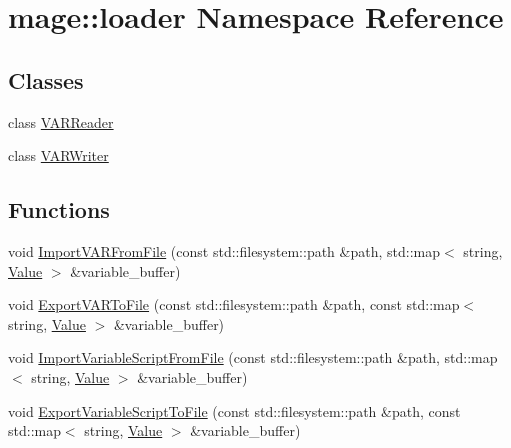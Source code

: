 \hypertarget{namespacemage_1_1loader}{}\section{mage\+:\+:loader Namespace Reference}
\label{namespacemage_1_1loader}
\subsection*{Classes}
\begin{DoxyCompactItemize}
\item 
class \mbox{\hyperlink{classmage_1_1loader_1_1_v_a_r_reader}{V\+A\+R\+Reader}}
\item 
class \mbox{\hyperlink{classmage_1_1loader_1_1_v_a_r_writer}{V\+A\+R\+Writer}}
\end{DoxyCompactItemize}
\subsection*{Functions}
\begin{DoxyCompactItemize}
\item 
void \mbox{\hyperlink{namespacemage_1_1loader_a0e99f2c09901dbd40c8b21337e4df664}{Import\+V\+A\+R\+From\+File}} (const std\+::filesystem\+::path \&path, std\+::map$<$ string, \mbox{\hyperlink{namespacemage_a5bc219b33037a43e23f59e4e8ddff10d}{Value}} $>$ \&variable\+\_\+buffer)
\item 
void \mbox{\hyperlink{namespacemage_1_1loader_a991788a6fa0dc0cd2aa31d865487f535}{Export\+V\+A\+R\+To\+File}} (const std\+::filesystem\+::path \&path, const std\+::map$<$ string, \mbox{\hyperlink{namespacemage_a5bc219b33037a43e23f59e4e8ddff10d}{Value}} $>$ \&variable\+\_\+buffer)
\item 
void \mbox{\hyperlink{namespacemage_1_1loader_a6b514f15e0f159970246055b5fe71e36}{Import\+Variable\+Script\+From\+File}} (const std\+::filesystem\+::path \&path, std\+::map$<$ string, \mbox{\hyperlink{namespacemage_a5bc219b33037a43e23f59e4e8ddff10d}{Value}} $>$ \&variable\+\_\+buffer)
\item 
void \mbox{\hyperlink{namespacemage_1_1loader_a672938d750e13c21cdb97c013a14bcb3}{Export\+Variable\+Script\+To\+File}} (const std\+::filesystem\+::path \&path, const std\+::map$<$ string, \mbox{\hyperlink{namespacemage_a5bc219b33037a43e23f59e4e8ddff10d}{Value}} $>$ \&variable\+\_\+buffer)
\end{DoxyCompactItemize}
